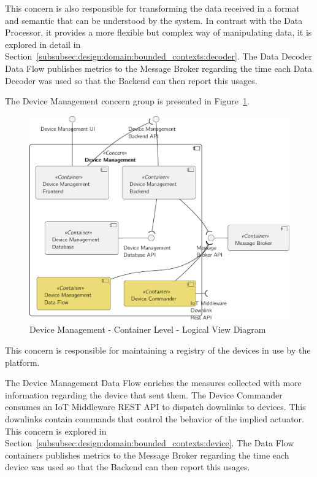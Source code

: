 This concern is also responsible for transforming the data received in a format and semantic that can be understood by the system. In contrast with the Data Processor, it provides a more flexible but complex way of manipulating data, it is explored in detail in Section~\ref{subsubsec:design:domain:bounded_contexts:decoder}. The Data Decoder Data Flow publishes metrics to the Message Broker regarding the time each Data Decoder was used so that the Backend can then report this usages.

The Device Management concern group is presented in Figure~\ref{fig:design:architecture:platform:containers:logical:device}.

\begin{figure}[H]
   \centering
   \includegraphics[page=1,width=0.8\columnwidth]{assets/diagrams/design/architectural/level2/logical/device-management-context.pdf}
   \caption[Device Management - Container Level - Logical View Diagram]{Device Management - Container Level - Logical View Diagram}
   \label{fig:design:architecture:platform:containers:logical:device}
\end{figure}

This concern is responsible for maintaining a registry of the devices in use by the platform.

The Device Management Data Flow enriches the measures collected with more information regarding the device that sent them. The Device Commander consumes an \gls{IoT} Middleware REST \gls{API} to dispatch downlinks to devices. This downlinks contain commands that control the behavior of the implied actuator.
This concern is explored in Section~\ref{subsubsec:design:domain:bounded_contexts:device}. The Data Flow containers publishes metrics to the Message Broker regarding the time each device was used so that the Backend can then report this usages.

